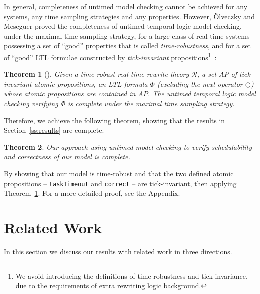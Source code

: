\documentclass[journal]{IEEEtranTIE}
\newtheorem{theorem}{Theorem}
\begin{document}
In general, completeness of untimed model checking cannot be achieved
for any systems, any time sampling strategies and any
properties. However, \"Olveczky and Meseguer proved the completeness
of untimed temporal logic model checking, under the maximal time
sampling strategy, for a large class of real-time systems possessing a
set of ``good'' properties that is called \emph{time-robustness}, and
for a set of ``good'' LTL formulae constructed by
\emph{tick-invariant} propositions\footnote{We avoid introducing the
  definitions of time-robustness and tick-invariance, due to the
  requirements of extra rewriting logic
  background.}~\cite{DBLP:journals/entcs/OlveczkyM07a}:
\begin{theorem}[\cite{DBLP:journals/entcs/OlveczkyM07a}]
\label{t:completeness}
Given a time-robust real-time rewrite theory $\mathcal{R}$, a set $AP$
of tick-invariant atomic propositions, an LTL formula $\Phi$
(excluding the \emph{next} operator $\bigcirc$) whose atomic
propositions are contained in $AP$. The untimed temporal logic model
checking verifying $\Phi$ is \emph{complete} under the maximal time
sampling strategy.
\end{theorem}

Therefore, we achieve the following theorem, showing that the results
in Section~\ref{ss:results} are complete.
\begin{theorem}
\label{t:main}
Our approach using untimed model checking to verify schedulability
and correctness of our model is complete.
\end{theorem}
\begin{IEEEproof}
By showing that our model is time-robust and that the two defined
atomic propositions -- \verb|taskTimeout| and \verb|correct| -- are
tick-invariant, then applying Theorem~\ref{t:completeness}. For a more
detailed proof, see the Appendix.
\end{IEEEproof}


\section{Related Work}
\label{s:relate}
In this section we discuss our results with related
work in three directions.
\end{document}

